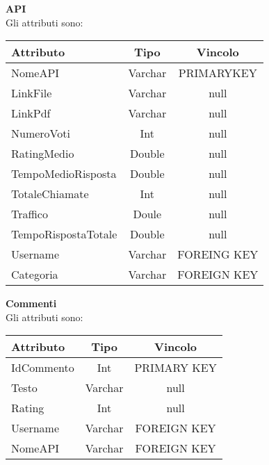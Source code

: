 {{		\textbf{API}\\
			Gli attributi sono:
			\begin{center}
			\renewcommand\arraystretch{1.2} \begin{tabular}{lcc}
				\textbf{Attributo}&\textbf{Tipo}&\textbf{Vincolo}\\ \hline
				NomeAPI&Varchar&PRIMARYKEY\\
				LinkFile&Varchar&null \\
				LinkPdf&Varchar&null \\
				NumeroVoti&Int&null \\
				RatingMedio&Double&null \\
				TempoMedioRisposta&Double&null \\
				TotaleChiamate&Int&null \\
				Traffico&Doule&null \\
				TempoRispostaTotale&Double&null \\
				Username&Varchar&FOREING KEY\\
				Categoria&Varchar&FOREIGN KEY\\
			\end{tabular}
			\end{center}
			
		\textbf{Commenti}\\
			Gli attributi sono:
			\begin{center}
			\renewcommand\arraystretch{1.2} \begin{tabular}{lcc}
				\textbf{Attributo}&\textbf{Tipo}&\textbf{Vincolo}\\ \hline
				IdCommento&Int&PRIMARY KEY\\
				Testo&Varchar&null \\
				Rating&Int&null \\
				Username&Varchar&FOREIGN KEY\\
				NomeAPI&Varchar&FOREIGN KEY\\
			\end{tabular}
			\end{center}
		
}}
